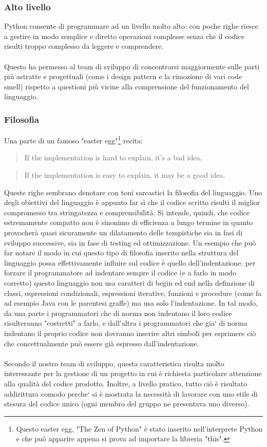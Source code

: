 \documentclass[12pt]{scrartcl}
\begin{document}
\subsubsection{Alto livello}
Python consente di programmare ad un livello molto alto: con poche righe riesce a gestire
in modo semplice e diretto operazioni complesse senza che il codice risulti troppo complesso da leggere e comprendere.
\\ \\
Questo ha permesso al team di sviluppo di concentrarsi maggiormente sulle parti pi\`u astratte
e progettuali (come i design pattern e la rimozione di vari code smell) rispetto
a questioni pi\`u vicine alla comprensione del funzionamento del linguaggio.
\subsubsection{Filosofia}
Una parte di un famoso "easter egg"\footnote{Questo easter egg, "The Zen of Python"
\`e stato inserito nell'interprete Python e che pu\`o apparire appena si prova ad 
importare la libreria "this".
}
recita:
\begin{quotation}
If the implementation is hard to explain, it's a bad idea.
\end{quotation}

\begin{quotation}
If the implementation is easy to explain, it may be a good idea.
\end{quotation}
Queste righe sembrano denotare con toni sarcastici la filosofia del linguaggio.
Uno degli obiettivi del linguaggio \`e appunto far s\`i che il codice scritto
risulti il miglior compromesso tra stringatezza e comprensibilit\`a. Si intende,
quindi, che codice estremamente compatto non \`e sinonimo di efficienza a lungo termine
in quanto provocher\`a quasi sicuramente un dilatamento delle tempistiche
sia in fasi di sviluppo successive, sia in fase di testing ed ottimizzazione.
Un esempio che pu\`o far notare il modo in cui questo tipo di filosofia inserito
nella struttura del linguaggio possa effettivamente influire sul codice \`e 
quello dell'indentazione: per forzare il programmatore ad indentare sempre
il codice (e a farlo in modo corretto) questo linguaggio non usa caratteri
di begin ed end nella definzione di classi, espressioni condizionali,
espressioni iterative, funzioni e procedure (come fa ad esempio Java con le
parentesi graffe) ma usa solo l'indentazione. In tal modo, da una parte i programmatori
che di norma non indentano il loro codice risulteranno "costretti" a farlo,
e dall'altra i programmatori che gia` di norma indentano il proprio codice
non dovranno inserire altri simboli per esprimere ci\`o che concettualmente
pu\`o essere gi\`a espresso dall'indentazione. \\ \\
Secondo il nostro team di sviluppo, questa caratteristica risulta molto
interessante per la gestione di un progetto in cui \`e richiesta
particolare attenzione alla qualit\`a del codice prodotto. Inoltre, a livello
pratico, tutto ci\`o \`e risultato addirittura comodo perche` si \`e mostrata la
necessit\`a di lavorare con uno stile di stesura del codice unico (ogni membro
del gruppo ne presentava uno diverso).
\end{document}
